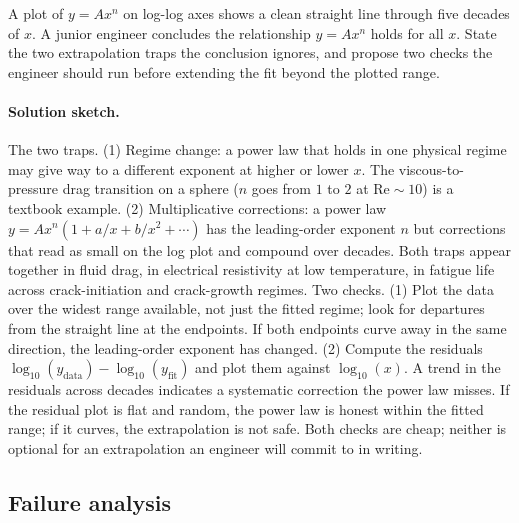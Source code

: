 \begin{exercise}
A plot of $y = A x^{n}$ on log-log axes shows a clean straight line
through five decades of $x$. A junior engineer concludes the
relationship $y = A x^{n}$ holds for all $x$. State the two
extrapolation traps the conclusion ignores, and propose two checks
the engineer should run before extending the fit beyond the plotted
range.

\paragraph{Solution sketch.}
The two traps. (1) Regime change: a power law that holds in one
physical regime may give way to a different exponent at higher or
lower $x$. The viscous-to-pressure drag transition on a sphere
($n$ goes from $1$ to $2$ at $\mathrm{Re} \sim 10$) is a textbook
example. (2) Multiplicative corrections: a power law $y = A x^{n}
(1 + a/x + b/x^{2} + \cdots)$ has the leading-order exponent $n$
but corrections that read as small on the log plot and compound
over decades. Both traps appear together in fluid drag, in
electrical resistivity at low temperature, in fatigue life across
crack-initiation and crack-growth regimes.
Two checks. (1) Plot the data over the widest range available, not
just the fitted regime; look for departures from the straight line
at the endpoints. If both endpoints curve away in the same
direction, the leading-order exponent has changed. (2) Compute the
residuals $\log_{10}(y_{\text{data}}) - \log_{10}(y_{\text{fit}})$
and plot them against $\log_{10}(x)$. A trend in the residuals
across decades indicates a systematic correction the power law
misses. If the residual plot is flat and random, the power law is
honest within the fitted range; if it curves, the extrapolation is
not safe. Both checks are cheap; neither is optional for an
extrapolation an engineer will commit to in writing.
\end{exercise}

\subsection*{Failure analysis}

